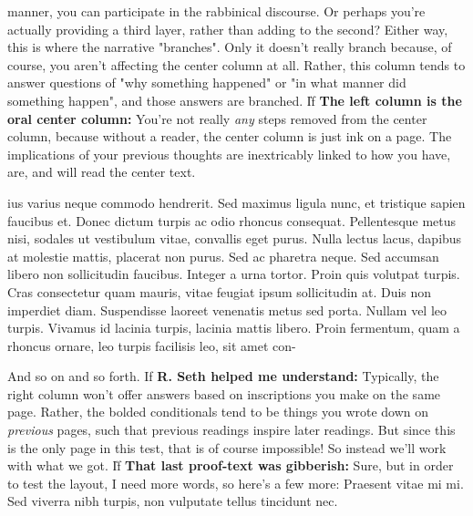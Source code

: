 \documentclass[11pt,letterpaper,openany]{scrbook}
\newcommand{\rightcitation}[1]{\rightcitationfont{\normalsize\textcolor{hcolor}{#1}}}
\begin{document}
\begin{sloppypar}
\begin{paracol}{3}
\switchcolumn

\fontsize{11}{13}\rightfont manner, you can participate in the rabbinical discourse. Or perhaps you're actually providing a third layer, rather than adding to the second? Either way, this is where the narrative "branches". Only it doesn't really branch because, of course,  you aren't affecting the center column at all. Rather, this column tends to answer questions of "why something happened" or "in what manner did something happen", and those answers are branched. \big\| If \textbf{The left column is the oral center column:} You're not really \textit{any} steps  removed from the center column, because without a reader, the center column is just ink on a page. The implications of your previous thoughts are inextricably linked to how you have, are, and will read the center text. 

\end{paracol}

\begin{paracol}{2}\fontsize{11}{13}\leftfont ius varius neque commodo hendrerit. Sed maximus ligula nunc, et tristique sapien faucibus et. Donec dictum turpis ac odio rhoncus consequat. Pellentesque metus nisi, sodales ut vestibulum vitae, convallis eget purus. Nulla lectus lacus, dapibus at molestie mattis, placerat non purus. Sed ac pharetra neque. Sed accumsan libero non sollicitudin faucibus. Integer a urna tortor. Proin quis volutpat turpis. Cras consectetur quam mauris, vitae feugiat ipsum sollicitudin at. Duis non imperdiet diam. Suspendisse laoreet venenatis metus sed porta. Nullam vel leo turpis. Vivamus id lacinia turpis, lacinia mattis libero. Proin fermentum, quam a rhoncus ornare, leo turpis facilisis leo, sit amet con- 

\switchcolumn

\fontsize{11}{13}\rightfont And so on and so forth.  \rightcitation{ב} \rightfont If \textbf{R. Seth helped me understand:} Typically, the right column won't offer answers based on inscriptions you make on the same page. Rather, the bolded conditionals tend to be things you wrote down on \textit{previous} pages, such that previous readings inspire later readings. But since this is the only page in this test, that is of course impossible! So instead we'll work with what we got. \big\| If \textbf{That last proof-text was gibberish:} Sure, but in order to test the layout, I need more words, so here's a few more: Praesent vitae mi mi. Sed viverra nibh turpis, non vulputate tellus tincidunt nec. 


\end{paracol}
\end{sloppypar}
\end{document}
